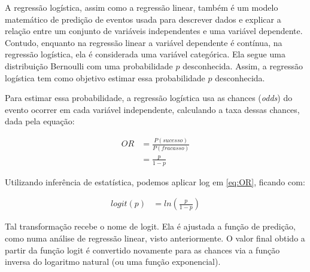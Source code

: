 A regressão logística, assim como a regressão linear, também é um modelo matemático de predição de eventos usada para descrever dados e explicar a relação entre um conjunto de variáveis independentes e uma variável dependente. Contudo, enquanto na regressão linear a variável dependente é contínua, na regressão logística, ela é considerada uma variável categórica. Ela segue uma distribuição Bernoulli\footnotemark {} com uma probabilidade \begin{math}p\end{math} desconhecida. Assim, a regressão logística tem como objetivo estimar essa probabilidade \begin{math}p\end{math} desconhecida.

Para estimar essa probabilidade, a regressão logística usa as chances (\emph{odds}) do evento ocorrer em cada variável independente, calculando a taxa dessas chances, dada pela equação:

\begin{equation}
  \label{eq:OR}
  \begin{aligned}
   OR &= \frac{P(sucesso)}{P(fracasso)}\\
     &= \frac{p}{1-p}
  \end{aligned}
\end{equation}

Utilizando inferência de estatística, podemos aplicar log em \ref{eq:OR}, ficando com:

\begin{equation}
  \label{eq:t}
  \begin{aligned}
    logit(p) &= ln\left ( \frac{p}{1-p} \right )
  \end{aligned}
\end{equation}

Tal transformação recebe o nome de logit. Ela é ajustada a função de predição, como numa análise de regressão linear, visto anteriormente. O valor final obtido a partir da função logit é convertido novamente para as chances via a função inversa do logaritmo natural (ou uma função exponencial).

